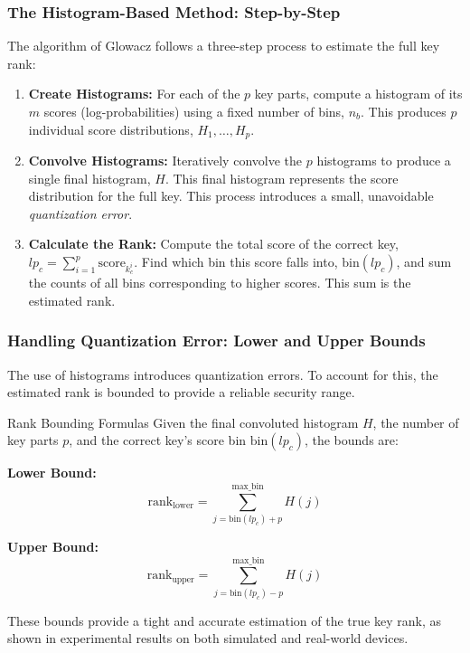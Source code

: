 \begin{frame}
    \frametitle{The Histogram-Based Method: Step-by-Step}

    The algorithm of Glowacz follows a three-step process to estimate the full key rank:

    \begin{enumerate}
        \item \textbf{Create Histograms:} For each of the $p$ key parts, compute a histogram of its $m$ scores (log-probabilities) using a fixed number of bins, $n_b$. This produces $p$ individual score distributions, $H_1, \dots, H_p$.
        
        \item \textbf{Convolve Histograms:} Iteratively convolve the $p$ histograms to produce a single final histogram, $H$. This final histogram represents the score distribution for the full key. This process introduces a small, unavoidable \textit{quantization error}.
        
        \item \textbf{Calculate the Rank:} Compute the total score of the correct key, $lp_c = \sum_{i=1}^{p} \text{score}_{k_c^i}$. Find which bin this score falls into, $\text{bin}(lp_c)$, and sum the counts of all bins corresponding to higher scores. This sum is the estimated rank.
    \end{enumerate}
\end{frame}


\begin{frame}
    \frametitle{Handling Quantization Error: Lower and Upper Bounds}
    
    The use of histograms introduces quantization errors. To account for this, the estimated rank is bounded to provide a reliable security range.
    
    \begin{block}{Rank Bounding Formulas}
        Given the final convoluted histogram $H$, the number of key parts $p$, and the correct key's score bin $\text{bin}(lp_c)$, the bounds are:
        
        \textbf{Lower Bound:}
        \[ \text{rank}_{\text{lower}} = \sum_{j=\text{bin}(lp_c)+p}^{\text{max\_bin}} H(j) \]
        
        \textbf{Upper Bound:}
        \[ \text{rank}_{\text{upper}} = \sum_{j=\text{bin}(lp_c)-p}^{\text{max\_bin}} H(j) \]
    \end{block}
    
    These bounds provide a tight and accurate estimation of the true key rank, as shown in experimental results on both simulated and real-world devices.
\end{frame}




